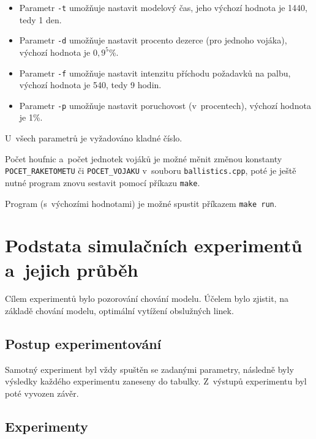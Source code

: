 \documentclass[a4paper]{article}
\begin{document}
            \begin{itemize}
                \item Parametr \texttt{-t} umožňuje nastavit modelový čas, jeho výchozí hodnota je 1440, tedy 1 den.
                \item Parametr \texttt{-d} umožňuje nastavit procento dezerce (pro jednoho vojáka), výchozí hodnota je $0,9^5$\%.
                \item Parametr \texttt{-f} umožňuje nastavit intenzitu příchodu požadavků na palbu, výchozí hodnota je 540, tedy 9 hodin.
                \item Parametr \texttt{-p} umožňuje nastavit poruchovost (v~procentech), výchozí hodnota je 1\%.
            \end{itemize}

            U~všech parametrů je vyžadováno kladné číslo.

            Počet houfnic a~počet jednotek vojáků je možné měnit změnou konstanty \texttt{POCET\_RAKETOMETU} či \texttt{POCET\_VOJAKU} v~souboru \texttt{ballistics.cpp},
            poté je ještě nutné program znovu sestavit pomocí příkazu \texttt{make}.

            Program (s~výchozími hodnotami) je možné spustit příkazem \texttt{make run}.

    \section{Podstata simulačních experimentů a~jejich průběh}
    \label{sec:simulation}

        Cílem experimentů bylo pozorování chování modelu.
        Účelem bylo zjistit, na základě chování modelu, optimální vytížení obslužných linek.

        \subsection{Postup experimentování}
        \label{subsec:experiments_methods}

            Samotný experiment byl vždy spuštěn se zadanými parametry, následně byly výsledky každého experimentu
            zaneseny do tabulky. Z~výstupů experimentu byl poté vyvozen závěr.

        \subsection{Experimenty}
        \label{subsec:experiments}
\end{document}
